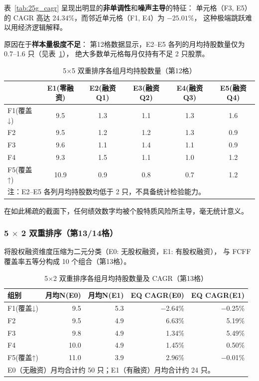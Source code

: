 \documentclass[a4paper,10pt]{article}
\begin{document}
表~\ref{tab:25g_cagr} 呈现出明显的\textbf{非单调性}和\textbf{噪声主导}的特征：
单元格（F3, E5）的 CAGR 高达 24.34\%，而邻近单元格（F1, E4）为 $-25.01\%$，
这种极端跳跃难以用经济逻辑解释。

原因在于\textbf{样本量极度不足}：
第12格数据显示，E2--E5 各列的月均持股数量仅为 0.7--1.6 只（见表~\ref{tab:12g_n}），
绝大多数单元格每月仅持有不足 2 只股票。

\begin{table}[H]
\centering
\caption{5$\times$5 双重排序各组月均持股数量（第12格）}
\label{tab:12g_n}
\begin{tabular}{@{}lccccc@{}}
\toprule
 & E1(零融资) & E2(融资Q1) & E3(融资Q2) & E4(融资Q3) & E5(融资Q4) \\
\midrule
F1(覆盖↓) & 9.5 & 1.3 & 1.1 & 1.3 & 1.6 \\
F2        & 9.5 & 1.2 & 1.2 & 1.3 & 0.9 \\
F3        & 9.6 & 1.1 & 1.4 & 1.1 & 0.9 \\
F4        & 9.3 & 1.5 & 1.1 & 1.0 & 1.2 \\
F5(覆盖↑) & 10.9 & 0.9 & 0.8 & 0.7 & 1.2 \\
\bottomrule
\multicolumn{6}{l}{\footnotesize 注：E2--E5 各列月均持股数均低于 2 只，不具备统计检验能力。} \\
\end{tabular}
\end{table}

在如此稀疏的截面下，任何绩效数字均被个股特质风险所主导，毫无统计意义。

\subsubsection{5 $\times$ 2 双重排序（第13/14格）}

将股权融资维度压缩为二元分类（E0: 无股权融资，E1: 有股权融资），
与 FCFF 覆盖率五等分构成 10 个组合（第13格）。

\begin{table}[H]
\centering
\caption{5$\times$2 双重排序各组月均持股数量及 CAGR（第13格）}
\label{tab:10g_summary}
\begin{tabular}{@{}lrrrr@{}}
\toprule
组别 & 月均N(E0) & 月均N(E1) & EQ CAGR(E0) & EQ CAGR(E1) \\
\midrule
F1(覆盖↓) & 9.5 & 5.3 & $-$2.64\% & $-$0.25\% \\
F2        & 9.5 & 4.9 & 6.63\%    & 5.19\% \\
F3        & 9.8 & 4.9 & 1.34\%    & 5.49\% \\
F4        & 10.0 & 4.9 & 1.45\%   & 0.50\% \\
F5(覆盖↑) & 11.0 & 3.9 & 2.96\%  & $-$0.01\% \\
\bottomrule
\multicolumn{5}{l}{\footnotesize E0（无融资）月均合计约 50 只；E1（有融资）月均合计约 24 只。} \\
\end{tabular}
\end{table}
\end{document}
